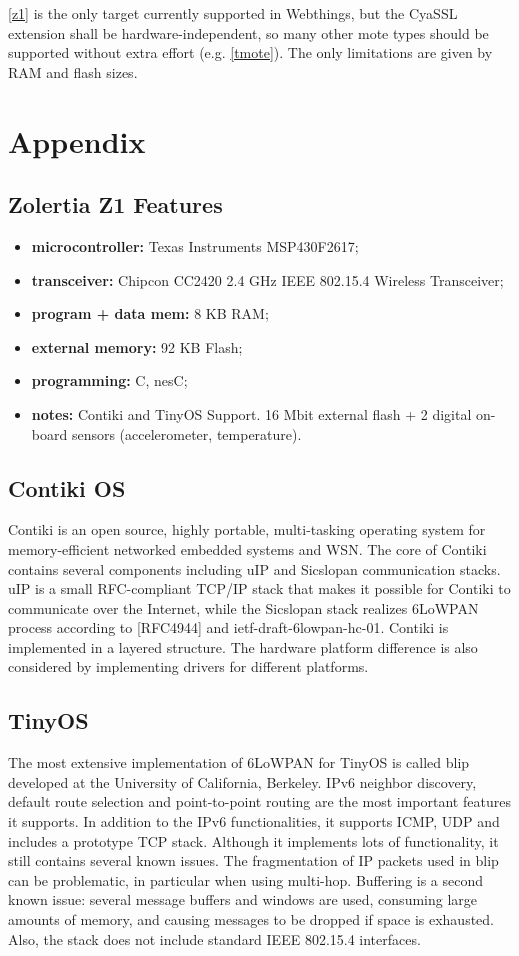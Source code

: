 \documentclass[10pt]{article}
\begin{document}
\ref{z1} is the only target currently supported in Webthings, but the CyaSSL extension shall be hardware-independent, so many other mote types should be supported without extra effort (e.g. \ref{tmote}). The only limitations are given by RAM and flash sizes.

\section{Appendix}

\subsection{Zolertia Z1 Features}
\begin{itemize}
  \item \textbf{microcontroller:} Texas Instruments MSP430F2617;
  \item \textbf{transceiver:} Chipcon CC2420 2.4 GHz IEEE 802.15.4 Wireless Transceiver;
  \item \textbf{program + data mem:} 8 KB RAM;
  \item \textbf{external memory:} 92 KB Flash;
  \item \textbf{programming:} C, nesC;
  \item \textbf{notes:} Contiki and TinyOS Support. 16 Mbit external flash + 2 digital on-board sensors (accelerometer, temperature).
\end{itemize}

\subsection{Contiki OS}
Contiki is an open source, highly portable, multi-tasking operating system for memory-efficient networked embedded systems and WSN.  The core of Contiki contains several components including uIP and Sicslopan communication stacks. uIP is a small RFC-compliant TCP/IP stack that makes it possible for Contiki to communicate over the Internet, while the Sicslopan stack realizes 6LoWPAN process according to [RFC4944] and ietf-draft-6lowpan-hc-01.  Contiki is implemented in a layered structure.  The hardware platform difference is also considered by implementing drivers for different platforms.  

\subsection{TinyOS}
The most extensive implementation of 6LoWPAN for TinyOS is called blip developed at the University of California, Berkeley.  IPv6 neighbor discovery, default route selection and point-to-point routing are the most important features it supports. In addition to the IPv6 functionalities, it supports ICMP, UDP and includes a prototype TCP stack.  Although it implements lots of functionality, it still contains several known issues.  The fragmentation of IP packets used in blip can be problematic, in particular when using multi-hop.  Buffering is a second known issue: several message buffers and windows are used, consuming large amounts of memory, and causing messages to be dropped if space is exhausted. Also, the stack does not include standard IEEE 802.15.4 interfaces.  
\end{document}
